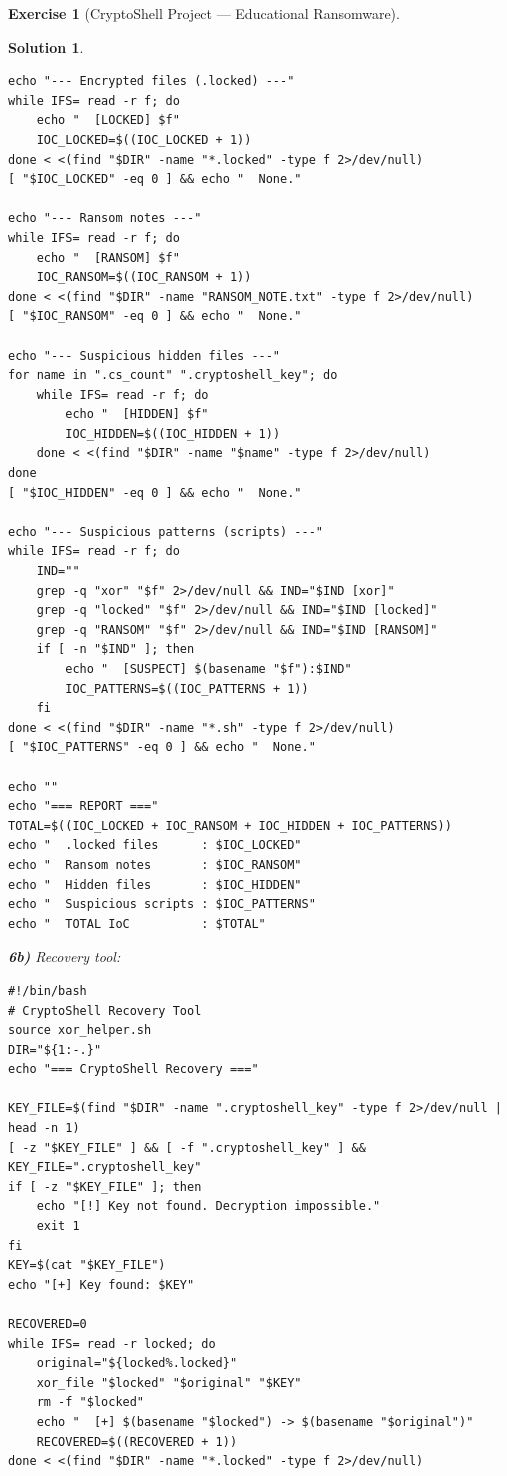 \documentclass[a4paper,11pt]{article}
\theoremstyle{plain}
\newtheorem{correction}{Solution}
\theoremstyle{definition}
\newtheorem{exercice}{Exercise}
\begin{document}
\begin{exercice}[CryptoShell Project --- Educational Ransomware]
\begin{correction}
\begin{lstlisting}[title=scanner.sh (phase6\_scanner.sh)]
echo "--- Encrypted files (.locked) ---"
while IFS= read -r f; do
    echo "  [LOCKED] $f"
    IOC_LOCKED=$((IOC_LOCKED + 1))
done < <(find "$DIR" -name "*.locked" -type f 2>/dev/null)
[ "$IOC_LOCKED" -eq 0 ] && echo "  None."

echo "--- Ransom notes ---"
while IFS= read -r f; do
    echo "  [RANSOM] $f"
    IOC_RANSOM=$((IOC_RANSOM + 1))
done < <(find "$DIR" -name "RANSOM_NOTE.txt" -type f 2>/dev/null)
[ "$IOC_RANSOM" -eq 0 ] && echo "  None."

echo "--- Suspicious hidden files ---"
for name in ".cs_count" ".cryptoshell_key"; do
    while IFS= read -r f; do
        echo "  [HIDDEN] $f"
        IOC_HIDDEN=$((IOC_HIDDEN + 1))
    done < <(find "$DIR" -name "$name" -type f 2>/dev/null)
done
[ "$IOC_HIDDEN" -eq 0 ] && echo "  None."

echo "--- Suspicious patterns (scripts) ---"
while IFS= read -r f; do
    IND=""
    grep -q "xor" "$f" 2>/dev/null && IND="$IND [xor]"
    grep -q "locked" "$f" 2>/dev/null && IND="$IND [locked]"
    grep -q "RANSOM" "$f" 2>/dev/null && IND="$IND [RANSOM]"
    if [ -n "$IND" ]; then
        echo "  [SUSPECT] $(basename "$f"):$IND"
        IOC_PATTERNS=$((IOC_PATTERNS + 1))
    fi
done < <(find "$DIR" -name "*.sh" -type f 2>/dev/null)
[ "$IOC_PATTERNS" -eq 0 ] && echo "  None."

echo ""
echo "=== REPORT ==="
TOTAL=$((IOC_LOCKED + IOC_RANSOM + IOC_HIDDEN + IOC_PATTERNS))
echo "  .locked files      : $IOC_LOCKED"
echo "  Ransom notes       : $IOC_RANSOM"
echo "  Hidden files       : $IOC_HIDDEN"
echo "  Suspicious scripts : $IOC_PATTERNS"
echo "  TOTAL IoC          : $TOTAL"
\end{lstlisting}

\textbf{6b)} Recovery tool:
\begin{lstlisting}[title=recovery.sh (phase6\_recovery.sh)]
#!/bin/bash
# CryptoShell Recovery Tool
source xor_helper.sh
DIR="${1:-.}"
echo "=== CryptoShell Recovery ==="

KEY_FILE=$(find "$DIR" -name ".cryptoshell_key" -type f 2>/dev/null | head -n 1)
[ -z "$KEY_FILE" ] && [ -f ".cryptoshell_key" ] && KEY_FILE=".cryptoshell_key"
if [ -z "$KEY_FILE" ]; then
    echo "[!] Key not found. Decryption impossible."
    exit 1
fi
KEY=$(cat "$KEY_FILE")
echo "[+] Key found: $KEY"

RECOVERED=0
while IFS= read -r locked; do
    original="${locked%.locked}"
    xor_file "$locked" "$original" "$KEY"
    rm -f "$locked"
    echo "  [+] $(basename "$locked") -> $(basename "$original")"
    RECOVERED=$((RECOVERED + 1))
done < <(find "$DIR" -name "*.locked" -type f 2>/dev/null)


\end{lstlisting}
\end{correction}
\end{exercice}
\end{document}
